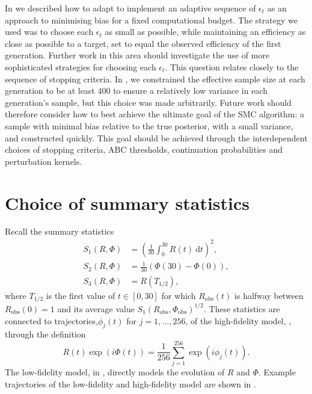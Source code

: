 \documentclass[12pt, onecolumn]{article}
\newcommand{\obs}[1]{#1_{\mathrm{obs}}}
\begin{document}
In  we described how to adapt  to implement an adaptive sequence of $\epsilon_t$ as an approach to minimising bias for a fixed computational budget.
The strategy we used was to choose each $\epsilon_t$ as small as possible, while maintaining an efficiency as close as possible to a target, set to equal the observed efficiency of the first generation.
Further work in this area should investigate the use of more sophisticated strategies for choosing each $\epsilon_t$.
This question relates closely to the sequence of stopping criteria.
In , we constrained the effective sample size at each generation to be at least $400$ to ensure a relatively low variance in each generation's sample, but this choice was made arbitrarily.
Future work should therefore consider how to best achieve the ultimate goal of the SMC algorithm: a sample with minimal bias relative to the true posterior, with a small variance, and constructed quickly.
This goal should be achieved through the interdependent choices of stopping criteria, ABC thresholds, continuation probabilities and perturbation kernels.



\clearpage
\pagebreak
\appendix

\renewcommand\thefigure{S.\arabic{figure}}
\setcounter{figure}{0}

\section{Choice of summary statistics}
\label{appendix:summary_statistics}

Recall the summary statistics
\begin{align*}
S_1(R, \Phi) &= \left( \frac{1}{30} \int_0^{30} R(t) ~\mathrm dt \right)^2, \\
S_2(R, \Phi) &= \frac{1}{30} \left( \Phi(30) - \Phi(0) \right), \\
S_3(R, \Phi) &= R \left( T_{1/2} \right),
\end{align*}
where $T_{1/2}$ is the first value of $t \in [0,30]$ for which $\obs R(t)$ is halfway between $\obs R(0)=1$ and its average value $S_1(\obs R, \obs \Phi)^{1/2}$.
These statistics are connected to trajectories,$\phi_j(t)$ for $j =1,\dots,256$, of the high-fidelity model, , through the definition
\[
R(t) \exp (i \Phi(t)) = \frac{1}{256} \sum_{j=1}^{256} \exp(i \phi_j(t)).
\]
The low-fidelity model, in , directly models the evolution of $R$ and $\Phi$.
Example trajectories of the low-fidelity and high-fidelity model are shown in .
\end{document}
